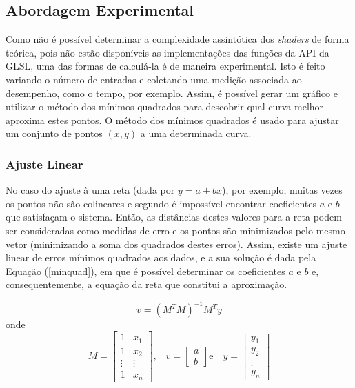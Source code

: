 {	\subsection{Abordagem Experimental}
	\label{metminqua}

	Como não é possível determinar a complexidade assintótica dos \textit{shaders} de forma teórica, pois não estão disponíveis as implementações das funções da API da GLSL, uma das formas de calculá-la é de maneira experimental. Isto é feito variando o número de entradas e coletando uma medição associada ao desempenho, como o tempo, por exemplo. Assim, é possível gerar um gráfico e utilizar o método dos mínimos quadrados para descobrir qual curva melhor aproxima estes pontos. O método dos mínimos quadrados é usado para ajustar um conjunto de pontos $(x,y)$ a uma determinada curva. 

	\subsubsection{Ajuste Linear}

	No caso do ajuste à uma reta (dada por $y = a + bx$), por exemplo, muitas vezes os pontos não são colineares e segundo \cite{minq} é impossível encontrar coeficientes $a$ e $b$ que satisfaçam o sistema.  Então, as distâncias destes valores para a reta podem ser consideradas como medidas de erro e os pontos são minimizados pelo mesmo vetor (minimizando a soma dos quadrados destes erros).  Assim, existe um ajuste linear de erros mínimos quadrados aos dados, e a sua solução é dada pela Equação (\ref{minquad}), em que é possível determinar os coeficientes $a$ e $b$ e, consequentemente, a equação da reta que constitui a aproximação. 

	\begin{equation}
		v =( M^{T}M)^{-1}M^{T}y
	\label{minquad}
	\end{equation}
	onde
	\begin{equation}
	M = \left[\begin{array}{cc}
               	1 & x_{1} \\
               	1 & x_{2}  \\
		\vdots & \vdots  \\
		1 & x_{n}
          	         \end{array}\right] \mbox{,} \quad
	v = \left[\begin{array}{c}
               	a \\
               	b  
          	         \end{array}\right] \mbox{e} \quad
	y = \left[\begin{array}{c}
               	y_{1} \\
               	y_{2}  \\
	 \vdots  \\
		y_{n}
          	         \end{array}\right] 	
	\label{variaveis}
	\end{equation}

}
